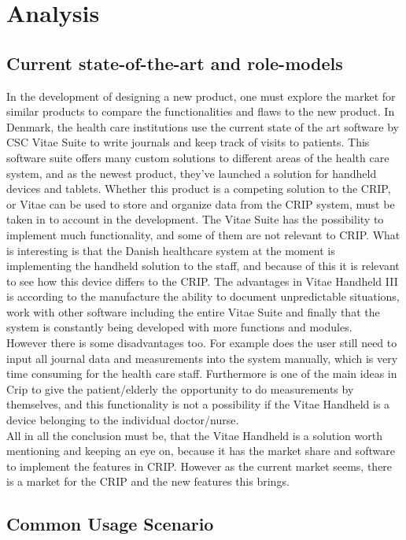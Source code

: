 \chapter{Analysis}
\section{Current state-of-the-art and role-models}
In the development of designing a new product, one must explore the market for similar products to compare the functionalities and flaws to the new product. In Denmark, the health care institutions use the current state of the art software by CSC Vitae Suite to write journals and keep track of visits to patients. This software suite offers many custom solutions to different areas of the health care system, and as the newest product, they’ve launched a solution for handheld devices and tablets. Whether this product is a competing solution to the CRIP, or Vitae can be used to store and organize data from the CRIP system, must be taken in to account in the development. 
The Vitae Suite has the possibility to implement much functionality, and some of them are not relevant to CRIP. What is interesting is that the Danish healthcare system at the moment is implementing the handheld solution to the staff, and because of this it is relevant to see how this device differs to the CRIP. 
The advantages in Vitae Handheld III is according to the manufacture the ability to document unpredictable situations, work with other software including the entire Vitae Suite and finally that the system is constantly being developed with more functions and modules.  \\
However there is some disadvantages too. For example does the user still need to input all journal data and measurements into the system manually, which is very time consuming for the health care staff. Furthermore is one of the main ideas in Crip to give the patient/elderly the opportunity to do measurements by themselves, and this functionality is not a possibility if the Vitae Handheld is a device belonging to the individual doctor/nurse. \\
All in all the conclusion must be, that the Vitae Handheld is a solution worth mentioning and keeping an eye on, because it has the market share and software to implement the features in CRIP. However as the current market seems, there is a market for the CRIP and the new features this brings. \\


\section{Common Usage Scenario}
